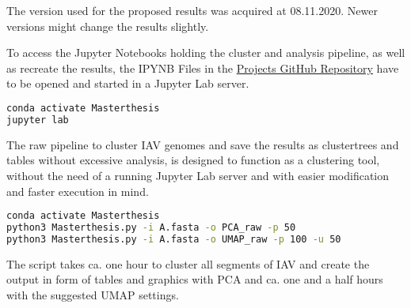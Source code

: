 The version used for the proposed results was acquired at 08.11.2020. Newer versions might change the results slightly.

To access the Jupyter Notebooks holding the cluster and analysis pipeline, as well as recreate the results, the IPYNB Files in the \href{https://github.com/ahenoch/Masterthesis.git}{Projects GitHub Repository} have to be opened and started in a Jupyter Lab server.

\begin{lstlisting}[language=sh]
conda activate Masterthesis
jupyter lab
\end{lstlisting}  

The raw pipeline to cluster \gls{IAV} genomes and save the results as clustertrees and tables without excessive analysis, is designed to function as a clustering tool, without the need of a running Jupyter Lab server and with easier modification and faster execution in mind.

\begin{lstlisting}[language=sh]
conda activate Masterthesis
python3 Masterthesis.py -i A.fasta -o PCA_raw -p 50
python3 Masterthesis.py -i A.fasta -o UMAP_raw -p 100 -u 50
\end{lstlisting}  

The script takes ca. one hour to cluster all segments of \gls{IAV} and create the output in form of tables and graphics with \gls{PCA} and ca. one and a half hours with the suggested \gls{UMAP} settings.

